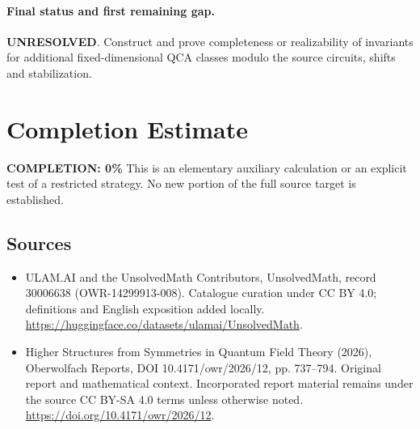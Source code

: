 \documentclass[11pt]{article}
\begin{document}
\paragraph{Final status and first remaining gap.}
\textbf{UNRESOLVED}. Construct and prove completeness or realizability of invariants for additional fixed-dimensional QCA classes modulo the source circuits, shifts and stabilization.

\section{Completion Estimate}
\noindent\textbf{COMPLETION: 0\%}
This is an elementary auxiliary calculation or an explicit test of a restricted strategy. No new portion of the full source target is established.

\subsection{Sources}
\begin{itemize}
\item[\hypertarget{source:30006638:1}{S1}] ULAM.AI and the UnsolvedMath Contributors, UnsolvedMath, record 30006638 (OWR-14299913-008). Catalogue curation under CC BY 4.0; definitions and English exposition added locally.
\url{https://huggingface.co/datasets/ulamai/UnsolvedMath}.
\item[\hypertarget{source:30006638:2}{S2}] Higher Structures from Symmetries in Quantum Field Theory (2026), Oberwolfach Reports, DOI 10.4171/owr/2026/12, pp. 737--794. Original report and mathematical context. Incorporated report material remains under the source CC BY-SA 4.0 terms unless otherwise noted.
\url{https://doi.org/10.4171/owr/2026/12}.
\end{itemize}
\label{end:30006638}
\end{document}

